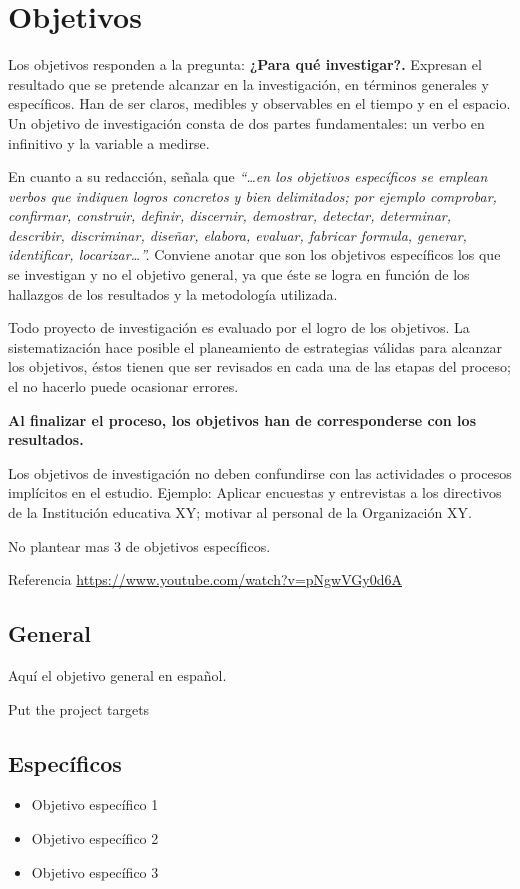 \chapter{Objetivos}
\label{Objetivos}

Los objetivos responden a la pregunta: \textbf{¿Para qué investigar?.} Expresan el resultado que se pretende alcanzar en la investigación, en términos generales y específicos. Han de ser claros, medibles y observables en el tiempo y en el espacio. Un objetivo de investigación consta de dos partes fundamentales: un verbo en infinitivo y la variable a medirse.

En cuanto a su redacción, \cite{herrera2004tutoria} señala que \textit{ “…en los objetivos específicos se emplean verbos que indiquen logros concretos y bien delimitados; por ejemplo comprobar, confirmar, construir, definir, discernir, demostrar, detectar, determinar, describir, discriminar, diseñar, elabora, evaluar, fabricar formula, generar, identificar, locarizar…”.} Conviene anotar que son los objetivos específicos los que se investigan y no el objetivo general, ya que éste se logra en función de los hallazgos de los resultados y la metodología utilizada.

Todo proyecto de investigación es evaluado por el logro de los objetivos. La sistematización hace posible el planeamiento de estrategias válidas para alcanzar los objetivos, éstos tienen que ser revisados en cada una de las etapas del proceso; el no hacerlo puede ocasionar errores. 

\textbf{Al finalizar el proceso, los objetivos han de corresponderse con los resultados.}

Los objetivos de investigación no deben confundirse con las actividades o procesos 
implícitos en el estudio. Ejemplo: Aplicar encuestas y entrevistas a los directivos de la 
Institución educativa XY; motivar al personal de la Organización XY.

No plantear mas 3 de objetivos específicos.

Referencia \url{https://www.youtube.com/watch?v=pNgwVGy0d6A}

\section{General}
Aquí el objetivo general en español.

Put the project targets


\section{Específicos}
\begin{itemize}
    \item Objetivo específico 1
    \item Objetivo específico 2
    \item Objetivo específico 3
\end{itemize}